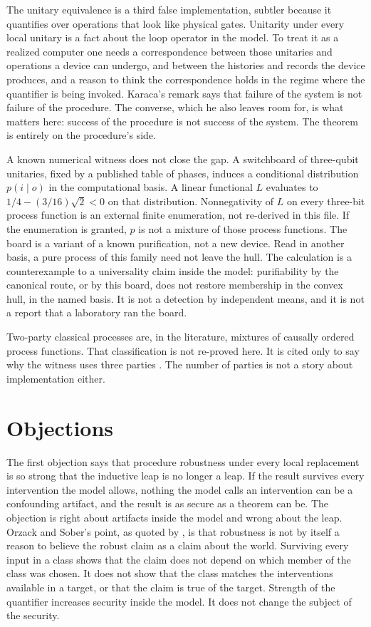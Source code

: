 \documentclass[12pt]{article}
\begin{document}
The unitary equivalence is a third false implementation, subtler because it quantifies over operations that look like physical gates. Unitarity under every local unitary is a fact about the loop operator in the model. To treat it as a realized computer one needs a correspondence between those unitaries and operations a device can undergo, and between the histories and records the device produces, and a reason to think the correspondence holds in the regime where the quantifier is being invoked. Karaca's remark says that failure of the system is not failure of the procedure. The converse, which he also leaves room for, is what matters here: success of the procedure is not success of the system. The theorem is entirely on the procedure's side.

A known numerical witness does not close the gap. A switchboard of three-qubit unitaries, fixed by a published table of phases, induces a conditional distribution \(p(i\mid o)\) in the computational basis. A linear functional \(L\) evaluates to \(1/4-(3/16)\sqrt{2}<0\) on that distribution. Nonnegativity of \(L\) on every three-bit process function is an external finite enumeration, not re-derived in this file. If the enumeration is granted, \(p\) is not a mixture of those process functions. The board is a variant of a known purification, not a new device. Read in another basis, a pure process of this family need not leave the hull. The calculation is a counterexample to a universality claim inside the model: purifiability by the canonical route, or by this board, does not restore membership in the convex hull, in the named basis. It is not a detection by independent means, and it is not a report that a laboratory ran the board.

Two-party classical processes are, in the literature, mixtures of causally ordered process functions. That classification is not re-proved here. It is cited only to say why the witness uses three parties \citep{oreshkov2012}. The number of parties is not a story about implementation either.

\section{Objections}
\label{sec:obj}

The first objection says that procedure robustness under every local replacement is so strong that the inductive leap is no longer a leap. If the result survives every intervention the model allows, nothing the model calls an intervention can be a confounding artifact, and the result is as secure as a theorem can be. The objection is right about artifacts inside the model and wrong about the leap. Orzack and Sober's point, as quoted by \citet{kuorikoski2007}, is that robustness is not by itself a reason to believe the robust claim as a claim about the world. Surviving every input in a class shows that the claim does not depend on which member of the class was chosen. It does not show that the class matches the interventions available in a target, or that the claim is true of the target. Strength of the quantifier increases security inside the model. It does not change the subject of the security.
\end{document}
